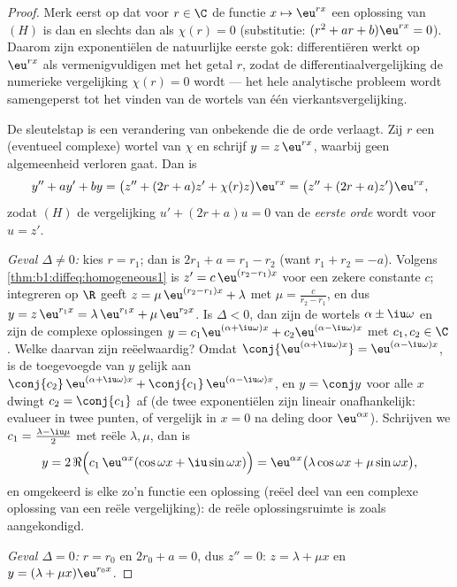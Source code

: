\begin{proof}
Merk eerst op dat voor $r \in \C$ de functie $x \mapsto \eu^{rx}$ een
oplossing van $(H)$ is dan en slechts dan als $\chi(r) = 0$
(substitutie: $(r^2 + ar + b)\eu^{rx} = 0$). Daarom zijn exponentiëlen de
natuurlijke eerste gok: differentiëren werkt op $\eu^{rx}$ als
vermenigvuldigen met het getal $r$, zodat de differentiaalvergelijking
de numerieke vergelijking $\chi(r) = 0$ wordt --- het hele analytische
probleem wordt samengeperst tot het vinden van de wortels van één
vierkantsvergelijking.

De sleutelstap is een verandering van onbekende die de orde verlaagt. Zij
$r$ een (eventueel complexe) wortel van $\chi$ en schrijf $y = z\,
\eu^{rx}$, waarbij geen algemeenheid verloren gaat. Dan is
\[
y'' + ay' + by
= \bigl(z'' + (2r + a) z' + \chi(r) z\bigr)\eu^{rx}
= \bigl(z'' + (2r + a) z'\bigr)\eu^{rx},
\]
zodat $(H)$ de vergelijking $u' + (2r + a) u = 0$ van de \emph{eerste
orde} wordt voor $u = z'$.

\emph{Geval $\Delta \neq 0$:} kies $r = r_1$; dan is $2r_1 + a = r_1 -
r_2$ (want $r_1 + r_2 = -a$). Volgens
\cref{thm:b1:diffeq:homogeneous1} is $z' = c\,\eu^{(r_2 - r_1)x}$ voor
een zekere constante $c$; integreren op $\R$ geeft $z = \mu\, \eu^{(r_2 -
r_1)x} + \lambda$ met $\mu = \frac{c}{r_2 - r_1}$, en dus $y = z\,
\eu^{r_1 x} = \lambda\,\eu^{r_1x} + \mu\,\eu^{r_2x}$. Is $\Delta < 0$,
dan zijn de wortels $\alpha \pm \iu\omega$ en zijn de complexe
oplossingen $y = c_1\eu^{(\alpha+\iu\omega)x} +
c_2\eu^{(\alpha-\iu\omega)x}$ met $c_1, c_2 \in \C$. Welke daarvan zijn
reëelwaardig? Omdat $\conj{\eu^{(\alpha+\iu\omega)x}} =
\eu^{(\alpha-\iu\omega)x}$, is de toegevoegde van $y$ gelijk aan
$\conj{c_2}\, \eu^{(\alpha+\iu\omega)x} +
\conj{c_1}\,\eu^{(\alpha-\iu\omega)x}$, en $y = \conj y$ voor alle $x$
dwingt $c_2 = \conj{c_1}$ af (de twee exponentiëlen zijn lineair
onafhankelijk: evalueer in twee punten, of vergelijk in $x=0$ na deling
door $\eu^{\alpha x}$). Schrijven we $c_1 = \frac{\lambda - \iu\mu}2$ met
reële $\lambda, \mu$, dan is
\[
y = 2\,\Re\Bigl(c_1\,\eu^{\alpha x}(\cos\omega x +
\iu\sin\omega x)\Bigr)
= \eu^{\alpha x}\bigl(\lambda\cos\omega x + \mu\sin\omega
x\bigr),
\]
en omgekeerd is elke zo'n functie een oplossing (reëel deel van een
complexe oplossing van een reële vergelijking): de reële
oplossingsruimte is zoals aangekondigd.

\emph{Geval $\Delta = 0$:} $r = r_0$ en $2r_0 + a = 0$, dus $z'' = 0$: $z
= \lambda + \mu x$ en $y = (\lambda + \mu x)\eu^{r_0 x}$.
\end{proof}

